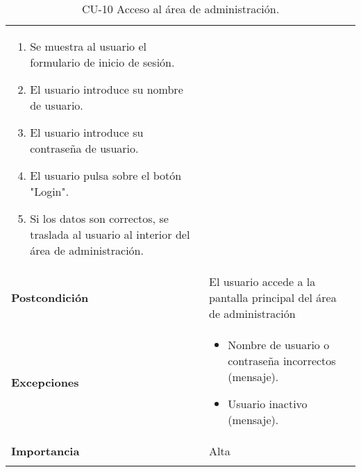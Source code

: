 \begin{longtable}[]{@{}ll@{}}
\begin{minipage}[t]{0.74\columnwidth}
\begin{enumerate}
\def\labelenumi{\arabic{enumi}.}
\tightlist
\item
  Se muestra al usuario el formulario de inicio de sesión.
\item
  El usuario introduce su nombre de usuario.
\item
  El usuario introduce su contraseña de usuario.
\item
  El usuario pulsa sobre el botón "Login".
\item
  Si los datos son correctos, se traslada al usuario al interior del
  área de administración.
\end{enumerate}\strut
\end{minipage}\tabularnewline
\begin{minipage}[t]{0.20\columnwidth}\raggedright
\textbf{Postcondición}\strut
\end{minipage} & \begin{minipage}[t]{0.74\columnwidth}\raggedright
El usuario accede a la pantalla principal del área de
administración\strut
\end{minipage}\tabularnewline
\begin{minipage}[t]{0.20\columnwidth}\raggedright
\textbf{Excepciones}\strut
\end{minipage} & \begin{minipage}[t]{0.74\columnwidth}\raggedright
\begin{itemize}
\tightlist
\item
  Nombre de usuario o contraseña incorrectos (mensaje).
\item
  Usuario inactivo (mensaje).
\end{itemize}\strut
\end{minipage}\tabularnewline
\begin{minipage}[t]{0.20\columnwidth}\raggedright
\textbf{Importancia}\strut
\end{minipage} & \begin{minipage}[t]{0.74\columnwidth}\raggedright
Alta\strut
\end{minipage}\tabularnewline
\bottomrule
\caption{CU-10 Acceso al área de administración.}
\end{longtable}

